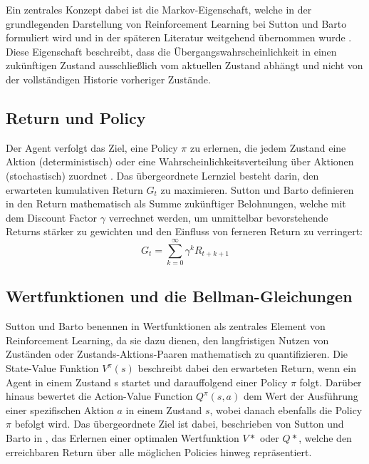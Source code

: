 Ein zentrales Konzept dabei ist die Markov-Eigenschaft, welche in der grundlegenden Darstellung von Reinforcement Learning bei Sutton und Barto formuliert wird und in der späteren Literatur weitgehend übernommen wurde \cite{sutton2018reinforcement, francois-lavetIntroductionDeepReinforcement2018, arulkumaranDRL2017}. Diese Eigenschaft beschreibt, dass die Übergangswahrscheinlichkeit in einen zukünftigen Zustand ausschließlich vom aktuellen Zustand abhängt und nicht von der vollständigen Historie vorheriger Zustände.
\subsection{Return und Policy}
Der Agent verfolgt das Ziel, eine Policy $\pi$ zu erlernen, die jedem Zustand eine Aktion (deterministisch) oder eine Wahrscheinlichkeitsverteilung über Aktionen (stochastisch) zuordnet \cite{sutton2018reinforcement, francois-lavetIntroductionDeepReinforcement2018}. Das übergeordnete Lernziel besteht darin, den erwarteten kumulativen Return $G_t$ zu maximieren. Sutton und Barto definieren in \cite{sutton2018reinforcement} den Return mathematisch als Summe zukünftiger Belohnungen, welche mit dem Discount Factor $\gamma$ verrechnet werden, um unmittelbar bevorstehende Returns stärker zu gewichten und den Einfluss von ferneren Return zu verringert:
\begin{equation}
	G_t = \sum_{k=0}^{\infty}\gamma^k R_{t+k+1}
\end{equation}
\subsection{Wertfunktionen und die Bellman-Gleichungen} %
Sutton und Barto benennen in \cite{sutton2018reinforcement} Wertfunktionen als zentrales Element von Reinforcement Learning, da sie dazu dienen, den langfristigen Nutzen von Zuständen oder Zustands-Aktions-Paaren mathematisch zu quantifizieren. Die State-Value Funktion $V^{\pi}(s)$ beschreibt dabei den erwarteten Return, wenn ein Agent in einem Zustand s startet und darauffolgend einer Policy $\pi$ folgt. Darüber hinaus bewertet die Action-Value Function $Q^{\pi}(s, a)$ dem Wert der Ausführung einer spezifischen Aktion $a$ in einem Zustand $s$, wobei danach ebenfalls die Policy $\pi$ befolgt wird. \newline
Das übergeordnete Ziel ist dabei, beschrieben von Sutton und Barto in \cite{sutton2018reinforcement}, das Erlernen einer optimalen Wertfunktion $V*$ oder $Q*$, welche den erreichbaren Return über alle möglichen Policies hinweg repräsentiert.

